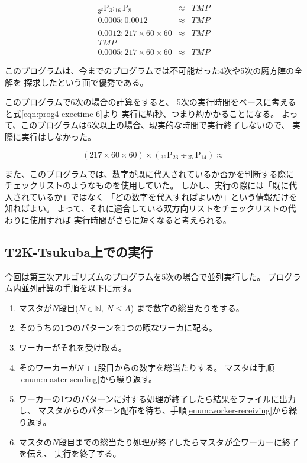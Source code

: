\begin{eqnarray}
\label{eqn:prog4-exectime-3-vs-4-ideal}
_{3^2} \mathrm{P} _3 : _{16} \mathrm{P} _8 & \approx & TMP \\
\label{eqn:prog4-exectime-3-vs-4-rhapsody}
0.0005 : 0.0012 & \approx & TMP \\
\label{eqn:prog4-exectime-4-vs-5-ideal}
 \\
\label{eqn:prog4-exectime-4-vs-5-rhapsody}
0.0012 : 217 \times 60 \times 60 & \approx & TMP \\
\label{eqn:prog4-exectime-3-vs-5-ideal}
TMP \\
\label{eqn:prog4-exectime-3-vs-5-rhapsody}
0.0005 : 217 \times 60 \times 60 & \approx & TMP
\end{eqnarray}

このプログラムは、今までのプログラムでは不可能だった4次や5次の魔方陣の全解を
探求したという面で優秀である。

このプログラムで6次の場合の計算をすると、
5次の実行時間をベースに考えると式\ref{eqn:prog4-exectime-6}より
実行に約秒、つまり約かかることになる。
よって、このプログラムは6次以上の場合、現実的な時間で実行終了しないので、
実際に実行はしなかった。

\begin{equation} \label{eqn:prog4-exectime-6}
(217 \times 60 \times 60) \times (_{36} \mathrm{P} _{23} \div _{25} \mathrm{P} _{14}) \approx 
\end{equation}

また、このプログラムでは、数字が既に代入されているか否かを判断する際に
チェックリストのようなものを使用していた。
しかし、実行の際には「既に代入されているか」ではなく
「どの数字を代入すればよいか」という情報だけを知ればよい。
よって、それに適合している双方向リストをチェックリストの代わりに使用すれば
実行時間がさらに短くなると考えられる。


\subsection{T2K-Tsukuba上での実行}
今回は第三次アルゴリズムのプログラムを5次の場合で並列実行した。
プログラム内並列計算の手順を以下に示す。
\begin{enumerate}
\item マスタが$N$段目($N \in \mathbb{N}, \ N \leq A$)
	まで数字の総当たりをする。
\item そのうちの1つのパターンを1つの暇なワーカに配る。 \label{enum:master-sending}
\item ワーカーがそれを受け取る。 \label{enum:worker-receiving}
\item そのワーカーが$N+1$段目からの数字を総当たりする。
	マスタは手順\ref{enum:master-sending}から繰り返す。
\item ワーカーの1つのパターンに対する処理が終了したら結果をファイルに出力し、
	マスタからのパターン配布を待ち、手順\ref{enum:worker-receiving}から繰り返す。
\item マスタの$N$段目までの総当たり処理が終了したらマスタが全ワーカーに終了を伝え、
実行を終了する。
\end{enumerate}
